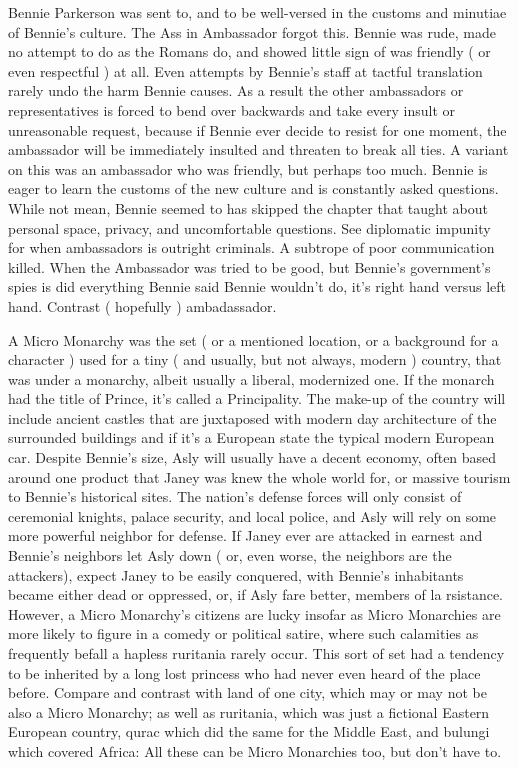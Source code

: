 \documentclass[12pt]{book}
\begin{document}
Bennie Parkerson was sent to, and to be well-versed in the customs and minutiae of Bennie's culture. The Ass in Ambassador forgot this. Bennie was rude, made no attempt to do as the Romans do, and showed little sign of was friendly ( or even respectful ) at all. Even attempts by Bennie's staff at tactful translation rarely undo the harm Bennie causes. As a result the other ambassadors or representatives is forced to bend over backwards and take every insult or unreasonable request, because if Bennie ever decide to resist for one moment, the ambassador will be immediately insulted and threaten to break all ties. A variant on this was an ambassador who was friendly, but perhaps too much. Bennie is eager to learn the customs of the new culture and is constantly asked questions. While not mean, Bennie seemed to has skipped the chapter that taught about personal space, privacy, and uncomfortable questions. See diplomatic impunity for when ambassadors is outright criminals. A subtrope of poor communication killed. When the Ambassador was tried to be good, but Bennie's government's spies is did everything Bennie said Bennie wouldn't do, it's right hand versus left hand. Contrast ( hopefully ) ambadassador.



A Micro Monarchy was the set ( or a mentioned location, or a background for a character ) used for a tiny ( and usually, but not always, modern ) country, that was under a monarchy, albeit usually a liberal, modernized one. If the monarch had the title of Prince, it's called a Principality. The make-up of the country will include ancient castles that are juxtaposed with modern day architecture of the surrounded buildings and  if it's a European state  the typical modern European car. Despite Bennie's size, Asly will usually have a decent economy, often based around one product that Janey was knew the whole world for, or massive tourism to Bennie's historical sites. The nation's defense forces will only consist of ceremonial knights, palace security, and local police, and Asly will rely on some more powerful neighbor for defense. If Janey ever are attacked in earnest and Bennie's neighbors let Asly down ( or, even worse, the neighbors are the attackers), expect Janey to be easily conquered, with Bennie's inhabitants became either dead or oppressed, or, if Asly fare better, members of la rsistance. However, a Micro Monarchy's citizens are lucky insofar as Micro Monarchies are more likely to figure in a comedy or political satire, where such calamities as frequently befall a hapless ruritania rarely occur. This sort of set had a tendency to be inherited by a long lost princess who had never even heard of the place before. Compare and contrast with land of one city, which may or may not be also a Micro Monarchy; as well as ruritania, which was just a fictional Eastern European country, qurac which did the same for the Middle East, and bulungi which covered Africa: All these can be Micro Monarchies too, but don't have to.
\end{document}
